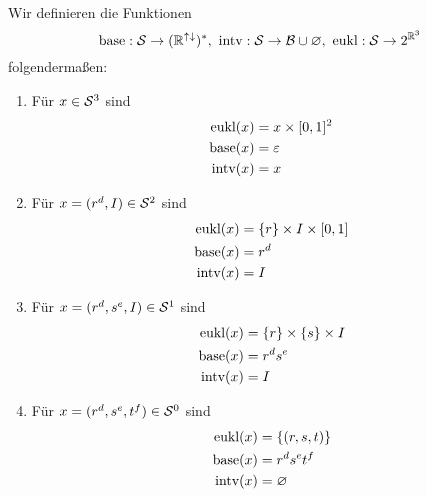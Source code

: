 \begin{bsp}
    \begin{align*}
        [3,5) &\in \einf^3\\
        (2^\upa, [0.2,1)) &\in \einf^2\\
        (2^\upa, [0,2)) &\notin \einf^2\\
        (2^\upa,0.7\downa, [0.2,1)) &\in \einf^1\\
        (2^\upa,1\downa, [0.2,1)) &\in \einf^1\\
        (2^\upa,0\downa, [0.2,1)) &\notin \einf^1\\
        (2^\upa,0.7\downa, 0.5\upa) &\in \einf^0\\
        (2^\upa,0.7\downa, 2\upa) &\notin \einf^0\\
        (2^\upa,0.7\downa, 1\upa) &\notin \einf^0
    \end{align*}
\end{bsp}


\begin{dfn}\ \\
    Wir definieren die Funktionen 
    $$\text{base}: \mathcal{S} \to (\mathbb{R}^{{\uparrow \downarrow}})^*,\ \text{intv}: \mathcal{S} \to \mathcal{B} \cup {\varnothing},\ \text{eukl}: \mathcal{S} \to 2^{\mathbb{R}^3}$$
    folgendermaßen:
    \begin{enumerate}
        \item Für $x \in \mathcal{S}^3$ sind
            \begin{align*}
                \text{eukl}(x) &= x \times [0,1]^2\\
                \text{base}(x) &= \varepsilon\\
                \text{intv}(x) &= x
            \end{align*}
        \item Für $x = (r^d, I) \in \mathcal{S}^2$ sind
            \begin{align*}
                \text{eukl}(x) &= \{r\} \times I \times [0,1]\\
                \text{base}(x) &= r^d\\
                \text{intv}(x) &= I
            \end{align*}
        \item Für $x = (r^d, s^e, I) \in \mathcal{S}^1$ sind
            \begin{align*}
                \text{eukl}(x) &= \{r\} \times \{s\} \times I\\
                \text{base}(x) &= r^d s^e\\
                \text{intv}(x) &= I
            \end{align*}
        \item Für $x = (r^d, s^e, t^f) \in \mathcal{S}^0$ sind
            \begin{align*}
                \text{eukl}(x) &= \{(r,s,t)\}\\
                \text{base}(x) &= r^d s^e t^f\\
                \text{intv}(x) &= \varnothing
            \end{align*}
    \end{enumerate}
\end{dfn}


